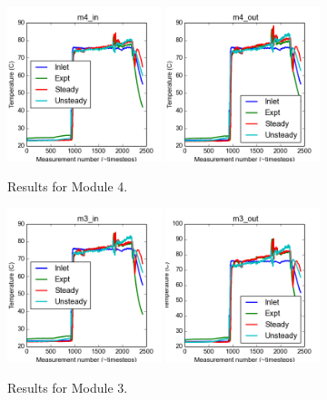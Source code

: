 \documentclass{article}
\begin{document}
\clearpage
\begin{figure}[!ht]
\centering
\includegraphics[width=0.4\textwidth]{../../data/ICSolar/images/Mar09_m4_in_compare.png}\hspace{0.05\textwidth}
\includegraphics[width=0.4\textwidth]{../../data/ICSolar/images/Mar09_m4_out_compare.png}\hspace{0.05\textwidth}\\
\caption{Results for Module 4.}\end{figure}
\begin{figure}[!ht]
\centering
\includegraphics[width=0.4\textwidth]{../../data/ICSolar/images/Mar09_m3_in_compare.png}\hspace{0.05\textwidth}
\includegraphics[width=0.4\textwidth]{../../data/ICSolar/images/Mar09_m3_out_compare.png}\hspace{0.05\textwidth}\\
\caption{Results for Module 3.}\end{figure}
\end{document}
